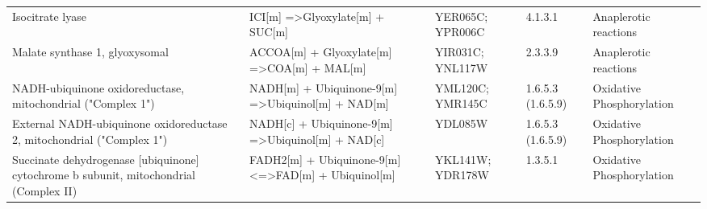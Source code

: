 \begin{table}[H]
\begin{center}
{\begin{tabular}{p{11cm}p{17cm}p{8cm}lp{5cm}}
Isocitrate lyase                                                                          & ICI{[}m{]} =\textgreater Glyoxylate{[}m{]} + SUC{[}m{]}                                                                                         & YER065C; YPR006C                                                                                                                                                 & 4.1.3.1            & Anaplerotic reactions                                                       \\
Malate synthase 1, glyoxysomal                                                            & ACCOA{[}m{]} + Glyoxylate{[}m{]} =\textgreater COA{[}m{]} + MAL{[}m{]}                                                                          & YIR031C; YNL117W                                                                                                                                                 & 2.3.3.9            & Anaplerotic reactions                                                       \\
NADH-ubiquinone oxidoreductase, mitochondrial ("Complex 1")                               & NADH{[}m{]} + Ubiquinone-9{[}m{]} =\textgreater Ubiquinol{[}m{]} + NAD{[}m{]}                                                                   & YML120C; YMR145C                                                                                                                                                 & 1.6.5.3 (1.6.5.9)  & Oxidative Phosphorylation                                                   \\
External NADH-ubiquinone oxidoreductase 2, mitochondrial ("Complex 1")                    & NADH{[}c{]} + Ubiquinone-9{[}m{]} =\textgreater Ubiquinol{[}m{]} + NAD{[}c{]}                                                                   & YDL085W                                                                                                                                                          & 1.6.5.3 (1.6.5.9)  & Oxidative Phosphorylation                                                   \\
Succinate dehydrogenase {[}ubiquinone{]} cytochrome b subunit, mitochondrial (Complex II) & FADH2{[}m{]} + Ubiquinone-9{[}m{]} \textless{}=\textgreater FAD{[}m{]} + Ubiquinol{[}m{]}                                                       & YKL141W; YDR178W                                                                                                                                                 & 1.3.5.1            & Oxidative Phosphorylation                                                   \\

\end{tabular}}
\end{center}
\end{table}
